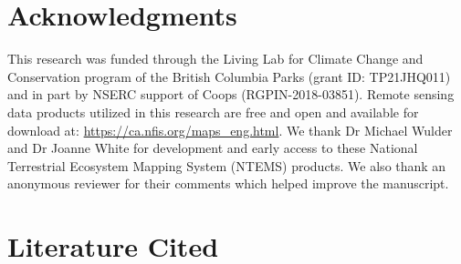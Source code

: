 \documentclass[11pt]{article}
\begin{document}
\newpage

\hypertarget{acknowledgments}{%
\section{Acknowledgments}\label{acknowledgments}}

This research was funded through the Living Lab for Climate Change and
Conservation program of the British Columbia Parks (grant ID:
TP21JHQ011) and in part by NSERC support of Coops (RGPIN-2018-03851).
Remote sensing data products utilized in this research are free and open
and available for download at: \url{https://ca.nfis.org/maps_eng.html}.
We thank Dr Michael Wulder and Dr Joanne White for development and early
access to these National Terrestrial Ecosystem Mapping System (NTEMS)
products. We also thank an anonymous reviewer for their comments which
helped improve the manuscript.

\hypertarget{literature-cited}{%
\section*{Literature Cited}\label{literature-cited}}
\end{document}
